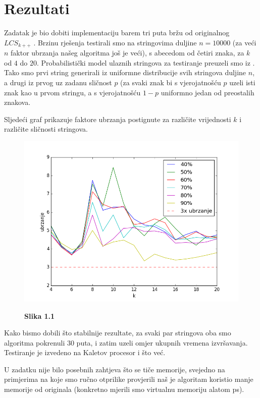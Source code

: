 \documentclass[times, utf8, seminar, numeric]{fer}
\begin{document}
\chapter{Rezultati}
Zadatak je bio dobiti implementaciju barem tri puta bržu od
originalnog $LCS_{k++}$ \cite{github}. Brzinu rješenja testirali
smo na stringovima duljine $n = 10000$ (za veći $n$ faktor ubrzanja
našeg algoritma još je veći), s abecedom od četiri znaka, za $k$ od
$4$ do $20$. Probabilistički model ulaznih stringova za testiranje
preuzeli smo iz \cite{Pavetic}. Tako smo prvi string generirali iz
uniformne distribucije svih stringova duljine $n$, a drugi iz prvog
uz zadanu sličnost $p$ (za svaki znak bi s vjerojatnošću $p$ uzeli
isti znak kao u prvom stringu, a s vjerojatnošću $1-p$ uniformno
jedan od preostalih znakova.

Sljedeći graf prikazuje faktore ubrzanja postignute za različite
vrijednosti $k$ i različite sličnosti stringova. 

\begin{figure}
  \begin{center}
    \includegraphics{../../test/speedplot.png}
  \end{center}
  \centering
  \textbf{Slika 1.1}  
\end{figure}

Kako bismo dobili što stabilnije rezultate, za svaki par stringova
oba smo algoritma pokrenuli $30$ puta, i zatim uzeli omjer ukupnih
vremena izvršavanja. Testiranje je izvedeno na {Kaletov procesor i
  što već}.

U zadatku nije bilo posebnih zahtjeva što se tiče memorije, svejedno
na primjerima na koje smo ručno otprilike provjerili naš je
algoritam koristio manje memorije od originala (konkretno mjerili
smo virtualnu memoriju alatom ps).
\end{document}
